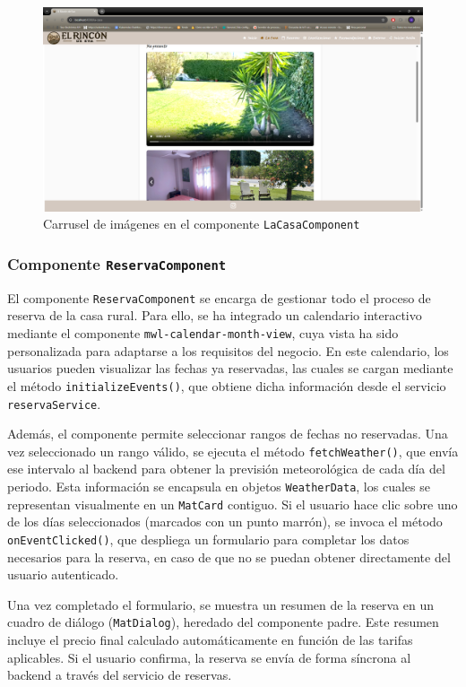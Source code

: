 \begin{figure}[h!tb]
\centering
\includegraphics[width=1\textwidth]{figs/la_casa_carrusel.png}
\caption{Carrusel de imágenes en el componente \texttt{LaCasaComponent}}
\label{fig:la-casa-carrusel-component}
\end{figure}
\subsubsection{Componente \texttt{ReservaComponent}}
El componente \texttt{ReservaComponent} se encarga de gestionar todo el proceso de reserva de la casa rural. Para ello, se ha integrado un calendario interactivo mediante el componente \texttt{mwl-calendar-month-view}, cuya vista ha sido personalizada para adaptarse a los requisitos del negocio. En este calendario, los usuarios pueden visualizar las fechas ya reservadas, las cuales se cargan mediante el método \texttt{initializeEvents()}, que obtiene dicha información desde el servicio \texttt{reservaService}.

Además, el componente permite seleccionar rangos de fechas no reservadas. Una vez seleccionado un rango válido, se ejecuta el método \texttt{fetchWeather()}, que envía ese intervalo al \gls{backend} para obtener la previsión meteorológica de cada día del periodo. Esta información se encapsula en objetos \texttt{WeatherData}, los cuales se representan visualmente en un \texttt{MatCard} contiguo. Si el usuario hace clic sobre uno de los días seleccionados (marcados con un punto marrón), se invoca el método \texttt{onEventClicked()}, que despliega un formulario para completar los datos necesarios para la reserva, en caso de que no se puedan obtener directamente del usuario autenticado.

Una vez completado el formulario, se muestra un resumen de la reserva en un cuadro de diálogo (\texttt{MatDialog}), heredado del componente padre. Este resumen incluye el precio final calculado automáticamente en función de las tarifas aplicables. Si el usuario confirma, la reserva se envía de forma síncrona al \gls{backend} a través del servicio de reservas.


